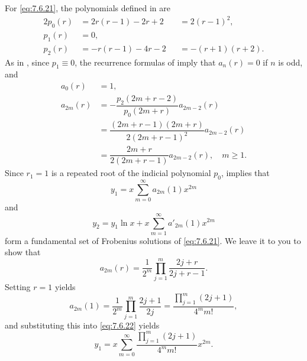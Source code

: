\begin{solution}
For \eqref{eq:7.6.21}, the polynomials defined in
 are
\begin{alignat*}{2}
p_0(r)&=2r(r-1)-2r+2&&=2(r-1)^2,\\
p_1(r)&=0,\\
p_2(r)&=-r(r-1)-4r-2&&=-(r+1)(r+2).
\end{alignat*}
As in , since $p_1\equiv0$,  the recurrence
formulas
of  imply that $a_n(r)=0$ if $n$ is odd, and
\begin{align*}
a_0(r)&=1,\\
a_{2m}(r)&=-\dfrac{p_2(2m+r-2)}{p_0(2m+r)}a_{2m-2}(r)\\
&=\dfrac{(2m+r-1)(2m+r)}{2(2m+r-1)^2}a_{2m-2}(r)\\
&=\dfrac{2m+r}{2(2m+r-1)}a_{2m-2}(r),\quad m\ge1.
\end{align*}
Since $r_1=1$ is a repeated root of the indicial polynomial $p_0$,
 implies that
\begin{equation} \label{eq:7.6.22}
y_1=x\sum_{m=0}^\infty  a_{2m}(1)x^{2m}
\end{equation}
and
\begin{equation} \label{eq:7.6.23}
y_2=y_1\ln x+x\sum_{m=1}^\infty a'_{2m}(1)x^{2m}
\end{equation}
form a fundamental set of  Frobenius solutions of \eqref{eq:7.6.21}.
We leave it to you to show  that
\begin{equation} \label{eq:7.6.24}
a_{2m}(r)=\frac{1}{2^m}\prod_{j=1}^m\frac{2j+r}{2j+r-1}.
\end{equation}
Setting $r=1$ yields
\begin{equation} \label{eq:7.6.25}
a_{2m}(1)=\frac{1}{2^m}\prod_{j=1}^m\frac{2j+1}{2j}
=\frac{\prod_{j=1}^m(2j+1)}{4^mm!},
\end{equation}
and substituting this into \eqref{eq:7.6.22} yields
\[
y_1=x\sum_{m=0}^\infty\frac{\prod_{j=1}^m(2j+1)}{4^mm!}x^{2m}.
\]


\end{solution}
